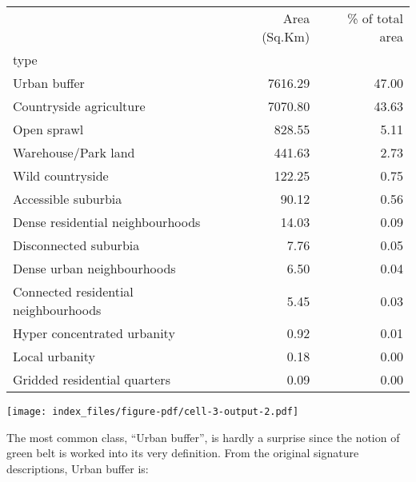 \documentclass[
  letterpaper,
  DIV=11,
  numbers=noendperiod,
  oneside]{scrartcl}
\begin{document}
\begin{tabular}{lrr}
\toprule
{} &  Area (Sq.Km) &  \% of total area \\
type                                 &               &                  \\
\midrule
Urban buffer                         &       7616.29 &            47.00 \\
Countryside agriculture              &       7070.80 &            43.63 \\
Open sprawl                          &        828.55 &             5.11 \\
Warehouse/Park land                  &        441.63 &             2.73 \\
Wild countryside                     &        122.25 &             0.75 \\
Accessible suburbia                  &         90.12 &             0.56 \\
Dense residential neighbourhoods     &         14.03 &             0.09 \\
Disconnected suburbia                &          7.76 &             0.05 \\
Dense urban neighbourhoods           &          6.50 &             0.04 \\
Connected residential neighbourhoods &          5.45 &             0.03 \\
Hyper concentrated urbanity          &          0.92 &             0.01 \\
Local urbanity                       &          0.18 &             0.00 \\
Gridded residential quarters         &          0.09 &             0.00 \\
\bottomrule
\end{tabular}

\begin{marginfigure}

{\centering \texttt{[image: index\_files/figure-pdf/cell-3-output-2.pdf]}

}

\end{marginfigure}

The most common class, ``Urban buffer'', is hardly a surprise since the
notion of green belt is worked into its very definition. From the
original signature descriptions,
Urban buffer is:
\end{document}
